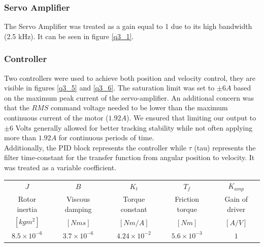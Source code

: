 \documentclass{article}
\theoremstyle{plain}
\theoremstyle{definition}
\theoremstyle{remark}
\begin{document}
\subsubsection*{Servo Amplifier}
The Servo Amplifier was treated as a gain equal to 1 due to its high bandwidth (2.5 kHz). It can be seen in figure \ref{q3_1}.

\subsubsection*{Controller}
Two controllers were used to achieve both position and velocity control, they are visible in figures \ref{q3_5} and \ref{q3_6}. The saturation limit was set to $\pm 6 A$ based on the maximum peak current of the servo-amplifier. An additional concern was that the $RMS$ command voltage needed to be lower than the maximum continuous current of the motor ($1.92 A$). We ensured that limiting our output to $\pm 6$ Volts generally allowed for better tracking stability while not often applying more than $1.92 A$ for continuous periods of time.\\

Additionally, the PID block represents the controller while $\tau$ (tau) represents the filter time-constant for the transfer function from angular position to velocity. It was treated as a variable coefficient.\\

\begin{table}[htb]
\begin{center}
    \begin{tabular}{|c|c|c|c|c|}
        \hline
        $J$                   & $B$                   &$K_t$                   & $T_f$                  & $K_{amp}$           \\
        Rotor inertia       & Viscous damping     & Torque constant      & Friction torque     & Gain of driver \\ 
        $[kgm^2]$           & $[Nms]$             & $[Nm/A]$             & $[Nm]$              & $[A/V]$        \\ \hline
        $8.5\times 10^{-6}$ & $3.7\times 10^{-6}$ & $4.24\times 10^{-2}$ & $5.6\times 10^{-3}$ & $1$            \\
        \hline
    \end{tabular}
\end{center}
\end{table}
\end{document}
